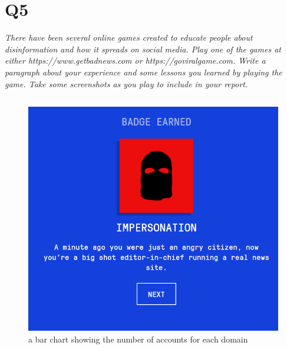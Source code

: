 \documentclass[12pt]{article}
\begin{document}
\section*{Q5}
\emph{There have been several online games created to educate people about disinformation and how it spreads on social media. Play one of the games at either https://www.getbadnews.com or https://goviralgame.com. Write a paragraph about your experience and some lessons you learned by playing the game. Take some screenshots as you play to include in your report.}
\subsection*{\color{blue}{Answer}}
\begin{figure}[H]
            \centering
            \includegraphics[trim=0 0 0 0, clip, width=\textwidth] {firstBadge.PNG}
            \caption{ a bar chart showing the number of accounts for each domain}
            \label{fig:1}
\end{figure}
\end{document}
